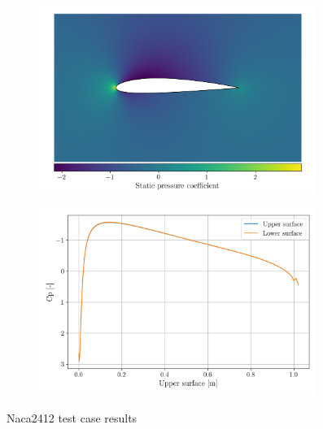 \documentclass{article}
\begin{document}
\begin{figure}[H]
    \centering
    \begin{subfigure}{0.49\textwidth}
        \centering
        \includegraphics[width=0.99\textwidth]{figures/naca2412_cp.png}
        \caption{}
        \label{fig:naca2412_cp}
    \end{subfigure}
    \begin{subfigure}{0.49\textwidth}
        \centering
        \includegraphics[width=0.99\textwidth]{figures/naca0012_surface_cp.png}
        \caption{}
        \label{fig:naca2412_mach}
    \end{subfigure}
    \caption{Naca2412 test case results}
\end{figure}
\end{document}
